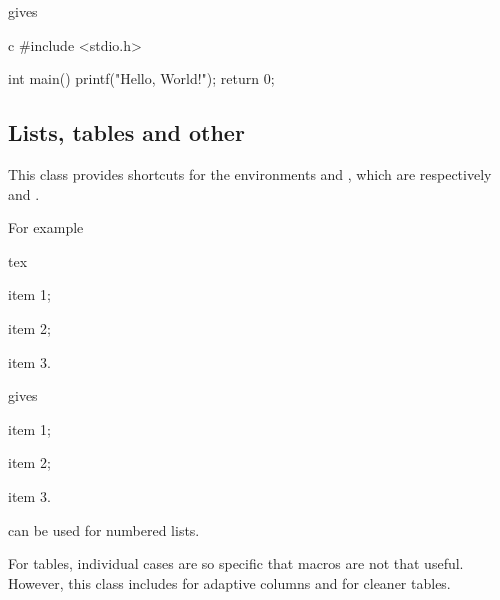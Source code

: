 \documentclass[a4paper, 11pt]{old-dms}
\begin{document}
{{gives

\begin{codebox}{c}
#include <stdio.h>

int main() {
    printf("Hello, World!");
    return 0;
}
\end{codebox}


\subsection{Lists, tables and other}

\setlength{\parskip}{8pt}

This class provides shortcuts for the environments  and , which are respectively  and .

For example
\begin{codeboxnonos}{tex}
\begin{ul}
    \item item 1;
    \item item 2;
    \item item 3.
\end{ul}
\end{codeboxnonos}

gives

\begin{ul}
    \item item 1;
    \item item 2;
    \item item 3.
\end{ul}

 can be used for numbered lists.

For tables, individual cases are so specific that macros are not that useful. However, this class includes  for adaptive columns and  for cleaner tables.

}}
\end{document}
